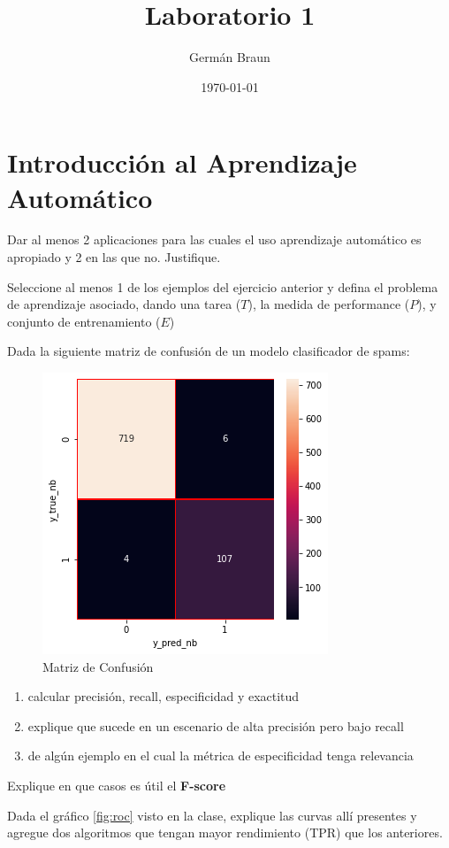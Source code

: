 \documentclass{homework}
\author{Germán Braun}
\date{\today}
\title{Laboratorio 1}
\begin{document}
 \maketitle

\section*{Introducción al Aprendizaje Automático}

\question Dar al menos 2 aplicaciones para las cuales el uso aprendizaje automático es apropiado y 2 en las que no. Justifique.

\question Seleccione al menos 1 de los ejemplos del ejercicio anterior y defina el problema de aprendizaje asociado, dando una tarea ($T$), la medida de performance ($P$), y conjunto de entrenamiento ($E$) 

\question Dada la siguiente matriz de confusión de un modelo clasificador de spams:

\begin{figure}[h!]
    \centering
    \includegraphics[width=0.5\linewidth]{mconf.png}
    \caption{Matriz de Confusión}\label{fig:matriz}
\end{figure}

\begin{enumerate}
    \item calcular precisión, recall, especificidad y exactitud
    \item explique que sucede en un escenario de alta precisión pero bajo recall
    \item de algún ejemplo en el cual la métrica de especificidad tenga relevancia 
\end{enumerate}

\question Explique en que casos es útil el \textbf{F-score}


\question Dada el gráfico \ref{fig:roc} visto en la clase, explique las curvas allí presentes y agregue dos algoritmos que tengan mayor rendimiento (TPR) que los anteriores. 
\end{document}
